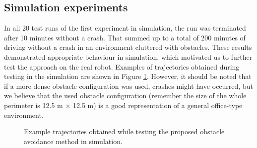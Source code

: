\subsection{Simulation experiments}
\label{sec:SimulationRes}

In all 20 test runs of the first experiment in simulation, the run was terminated after 10 minutes without a crash. That summed up to a total of 200 minutes of driving without a crash in an environment cluttered with obstacles. These results demonstrated appropriate behaviour in simulation, which motivated us to further test the approach on the real robot. Examples of trajectories obtained during testing in the simulation are shown in Figure \ref{fig:Fig06}. However, it should be noted that if a more dense obstacle configuration was used, crashes might have occurred, but we believe that the used obstacle configuration (remember the size of the whole perimeter is 12.5 m $\times$ 12.5 m) is a good representation of a general office-type environment.

\begin{figure}
    \centering
    \hfill
    \caption{Example trajectories obtained while testing the proposed obstacle avoidance method in simulation.}
    \label{fig:Fig06}
\end{figure}

